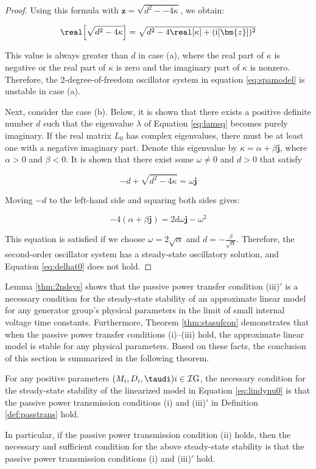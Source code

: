 \documentclass[graybox, envcountchap]{svmult}
\begin{document}
\begin{proof}
Using this formula with $ \bm{z} = \sqrt{d^2--4\kappa} $, we obtain:

\begin{equation*}
  \real \Bigl[
  \sqrt{d^2 - 4\kappa }
  \Bigr]
  =\sqrt{
  d^2 - 4 \real[\kappa]
  +
  (\imag[ \bm{z} ])^2
  }
\end{equation*}

This value is always greater than $d$ in case (a), where the real part of
$\kappa$ is negative or the real part of $\kappa$ is zero and the imaginary part
of $\kappa$ is nonzero. Therefore, the 2-degree-of-freedom oscillator system in
equation \ref{eq:spamodel} is unstable in case (a).

Next, consider the case (b). Below, it is shown that there exists a positive
definite number $d$ such that the eigenvalue $\lambda$ of Equation
\ref{eq:lamsq} becomes purely imaginary. If the real matrix $L_0$ has complex
eigenvalues, there must be at least one with a negative imaginary part. Denote
this eigenvalue by $\kappa = \alpha + \beta \bm{j}$, where $\alpha>0$ and
$\beta<0$.  It is shown that there exist some $\omega \neq 0$ and $d>0$ that
satisfy

\[
  -d + \sqrt{d^2-4\kappa}  = \omega \bm{j}
\]

Moving $-d$ to the left-hand side and squaring both sides gives:

\[
  -4 (\alpha + \beta \bm{j}) = 2d \omega \bm{j} -\omega^2
\]

This equation is satisfied if we choose $\omega = 2\sqrt{\alpha}$ and
$d=-\tfrac{\beta}{\sqrt{\alpha}}$. Therefore, the second-order oscillator
system has a steady-state oscillatory solution, and Equation \ref{eq:delhat0}
does not hold.
\end{proof}

Lemma \ref{thm:2ndsys} shows that the passive power transfer condition (iii)$'$
is a necessary condition for the steady-state stability of an approximate linear
model for any generator group's physical parameters in the limit of small
internal voltage time constants. Furthermore, Theorem \ref{thm:stasufcon}
demonstrates that when the passive power transfer conditions (i)--(iii) hold,
the approximate linear model is stable for any physical parameters. Based on
these facts, the conclusion of this section is summarized in the following
theorem.

\begin{theorem}\label{thm:sync}
For any positive parameters $(M_i,D_i,\taudi){i \in \mathcal{I}{\rm G}}$, the
necessary condition for the steady-state stability of the linearized model in
Equation \ref{eq:lindynu0} is that the passive power transmission conditions (i)
and (iii)$'$ in Definition \ref{def:passtrans} hold.

In particular, if the passive power transmission condition (ii) holds, then the
necessary and sufficient condition for the above steady-state stability is that
the passive power transmission conditions (i) and (iii)$'$ hold.
\end{theorem}
\end{document}
